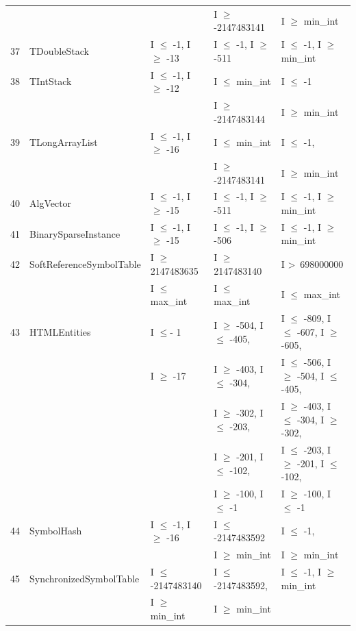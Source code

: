 {\begin{longtable}{|l|l|l|l|l|}
	&							&								& I $\ge$ -2147483141			& I $\ge$ min\_int				\\
37	& TDoubleStack				& I $\le$ -1, I $\ge$ -13			& I $\le$ -1, I $\ge$ -511			& I $\le$ -1, I $\ge$ min\_int	\\ 
38	& TIntStack					& I $\le$ -1, I $\ge$ -12			& I $\le$ min\_int				 	& I $\le$ -1 							\\ 
	&							&								& I $\ge$ -2147483144			& I $\ge$ min\_int				\\
39	& TLongArrayList				& I $\le$ -1, I $\ge$ -16			& I $\le$ min\_int 			& I $\le$ -1, 							\\ 
	&							&								& I $\ge$ -2147483141			& I $\ge$ min\_int				\\
40	& AlgVector					& I $\le$ -1, I $\ge$ -15			& I $\le$ -1, I $\ge$ -511			& I $\le$ -1, I $\ge$ min\_int	\\ 
41	& BinarySparseInstance		& I $\le$ -1, I $\ge$ -15			& I $\le$ -1, I $\ge$ -506			& I $\le$ -1, I $\ge$ min\_int	\\ 
42	& SoftReferenceSymbolTable	& I $\ge$ 2147483635			& I $\ge$ 2147483140			& I \textgreater~698000000					\\ 
	&                                             & I $\le$ max\_int					& I $\le$ max\_int					& I $\le$ max\_int			\\
43	& HTMLEntities				& I $\le$- 1						& I $\ge$ -504, I $\le$ -405,		& I $\le$ -809, I $\le$ -607, I $\ge$ -605,    		\\ 
	&                         			& I $\ge$ -17					& I $\ge$ -403, I $\le$ -304, 		& I $\le$ -506, I $\ge$ -504, I $\le$ -405,		 \\	
	&                         			& 								& I $\ge$ -302, I $\le$ -203,		& I $\ge$ -403, I $\le$ -304, I $\ge$ -302,		 \\	
	&                        				& 								& I $\ge$ -201, I $\le$ -102, 		& I $\le$ -203, I $\ge$ -201, I $\le$ -102,		 \\	
	&                         			& 								& I $\ge$ -100, I $\le$ -1			& I $\ge$ -100, I $\le$ -1				 			 \\	
44	& SymbolHash				& I $\le$ -1,  I $\ge$ -16			& I $\le$ -2147483592			& I $\le$ -1, 							\\ 
	&							&								& I $\ge$ min\_int				& I $\ge$ min\_int				\\
45	& SynchronizedSymbolTable	& I $\le$ -2147483140			& I $\le$ -2147483592,			& I $\le$ -1, I $\ge$ min\_int	\\ 
	&                                             & I $\ge$ min\_int					& I $\ge$ min\_int	 			&  			   								\\

\end{longtable}}
